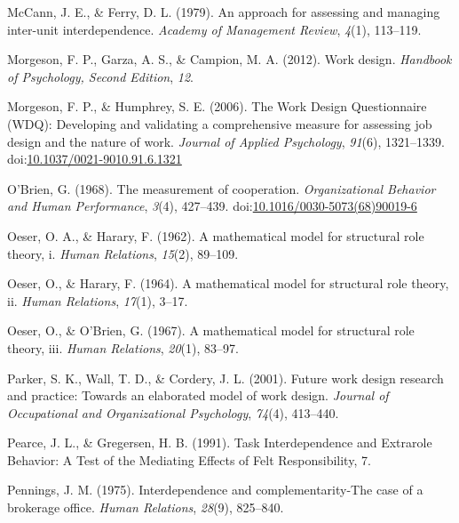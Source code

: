 \documentclass[english,,man]{apa6}
\theoremstyle{definition}
\theoremstyle{definition}
\theoremstyle{definition}
\theoremstyle{remark}
\begin{document}
\leavevmode\hypertarget{ref-mccann_approach_1979}{}%
McCann, J. E., \& Ferry, D. L. (1979). An approach for assessing and
managing inter-unit interdependence. \emph{Academy of Management
Review}, \emph{4}(1), 113--119.

\leavevmode\hypertarget{ref-morgeson2012work}{}%
Morgeson, F. P., Garza, A. S., \& Campion, M. A. (2012). Work design.
\emph{Handbook of Psychology, Second Edition}, \emph{12}.

\leavevmode\hypertarget{ref-morgeson_work_2006}{}%
Morgeson, F. P., \& Humphrey, S. E. (2006). The Work Design
Questionnaire (WDQ): Developing and validating a comprehensive measure
for assessing job design and the nature of work. \emph{Journal of
Applied Psychology}, \emph{91}(6), 1321--1339.
doi:\href{https://doi.org/10.1037/0021-9010.91.6.1321}{10.1037/0021-9010.91.6.1321}

\leavevmode\hypertarget{ref-obrien_measurement_1968}{}%
O'Brien, G. (1968). The measurement of cooperation. \emph{Organizational
Behavior and Human Performance}, \emph{3}(4), 427--439.
doi:\href{https://doi.org/10.1016/0030-5073(68)90019-6}{10.1016/0030-5073(68)90019-6}

\leavevmode\hypertarget{ref-oeser1962mathematical}{}%
Oeser, O. A., \& Harary, F. (1962). A mathematical model for structural
role theory, i. \emph{Human Relations}, \emph{15}(2), 89--109.

\leavevmode\hypertarget{ref-oeser1964mathematical}{}%
Oeser, O., \& Harary, F. (1964). A mathematical model for structural
role theory, ii. \emph{Human Relations}, \emph{17}(1), 3--17.

\leavevmode\hypertarget{ref-oeser1967mathematical}{}%
Oeser, O., \& O'Brien, G. (1967). A mathematical model for structural
role theory, iii. \emph{Human Relations}, \emph{20}(1), 83--97.

\leavevmode\hypertarget{ref-parker_future_2001}{}%
Parker, S. K., Wall, T. D., \& Cordery, J. L. (2001). Future work design
research and practice: Towards an elaborated model of work design.
\emph{Journal of Occupational and Organizational Psychology},
\emph{74}(4), 413--440.

\leavevmode\hypertarget{ref-pearce_task_nodate}{}%
Pearce, J. L., \& Gregersen, H. B. (1991). Task Interdependence and
Extrarole Behavior: A Test of the Mediating Effects of Felt
Responsibility, 7.

\leavevmode\hypertarget{ref-pennings_interdependence_1975}{}%
Pennings, J. M. (1975). Interdependence and complementarity-The case of
a brokerage office. \emph{Human Relations}, \emph{28}(9), 825--840.
\end{document}
